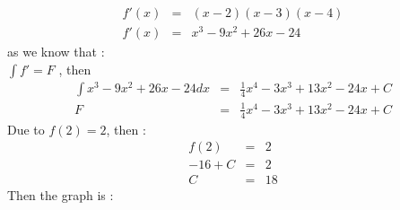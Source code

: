 \documentclass[12pt,a4paper]{article}
\begin{document}
	\begin{eqnarray*}
		f'(x) &=& (x-2) (x-3) (x-4) \\
		f'(x) &=& x^3 - 9x^2 + 26x - 24
	\end{eqnarray*}
	as we know that :
	\\ $\int f' = F$ , then
	\begin{eqnarray*}
		\int x^3 - 9x^2 + 26x - 24 dx &=& \frac{1}{4}x^4 - 3x^3 + 13x^2 - 24x + C \\
		F &=& \frac{1}{4}x^4 - 3x^3 + 13x^2 - 24x + C
	\end{eqnarray*}
	Due to $f(2) = 2$, then :
	\begin{eqnarray*}
		f(2) &=& 2 \\
		-16 + C &=& 2 \\
		C &=& 18
	\end{eqnarray*}
	Then the graph is :
	
\end{document}
